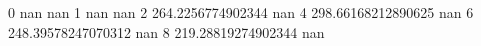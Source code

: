 0 nan nan
1 nan nan
2 264.2256774902344 nan
4 298.66168212890625 nan
6 248.39578247070312 nan
8 219.28819274902344 nan
